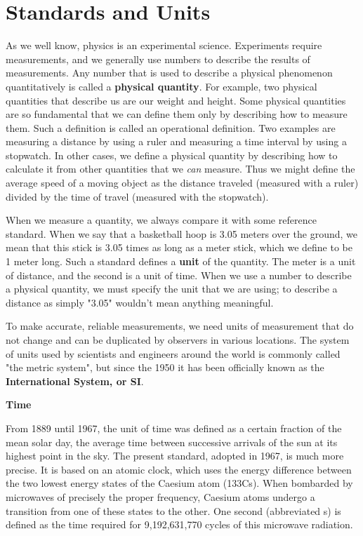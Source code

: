 \section{Standards and Units}
As we well know, physics is an experimental science. Experiments require measurements, and we generally use numbers to describe the results of measurements. Any number that is used to describe a physical phenomenon quantitatively is called a \textbf{physical quantity}. For example, two physical quantities that describe us are our weight and height. Some physical quantities are so fundamental that we can define them only by describing how to measure them. Such a definition is called an operational definition. Two examples are measuring a distance by using a ruler and measuring a time interval by using a stopwatch. In other cases, we define a physical quantity by describing how to calculate it from other quantities that we \textit{can} measure. Thus we might define the average speed of a moving object as the distance traveled (measured with a ruler) divided by the time of travel (measured with the stopwatch).

When we measure a quantity, we always compare it with some reference standard. When we say that a basketball hoop is 3.05 meters over the ground, we mean that this stick is 3.05 times as long as a meter stick, which we define to be 1 meter long. Such a standard defines a \textbf{unit} of the quantity. The meter is a unit of distance, and the second is a unit of time. When we use a number to describe a physical quantity, we must specify the unit that we are using; to describe a distance as simply "3.05" wouldn't mean anything meaningful. 

To make accurate, reliable measurements, we need units of measurement that do not change and can be duplicated by observers in various locations. The system of units used by scientists and engineers around the world is commonly called "the metric system", but since the 1950 it has been officially known as the \textbf{International System, or SI}.

\textbf{Time}

From 1889 until 1967, the unit of time was defined as a certain fraction of the mean solar day, the average time between successive arrivals of the sun at its highest point in the sky.
The present standard, adopted in 1967, is much more precise. It is based on an atomic clock, which uses the energy difference between the two lowest energy states of the Caesium atom (133Cs). When bombarded by microwaves of precisely the proper frequency, Caesium atoms undergo a transition from one of these states to the other. One second (abbreviated s) is defined as the time required for 9,192,631,770 cycles of this microwave radiation.

